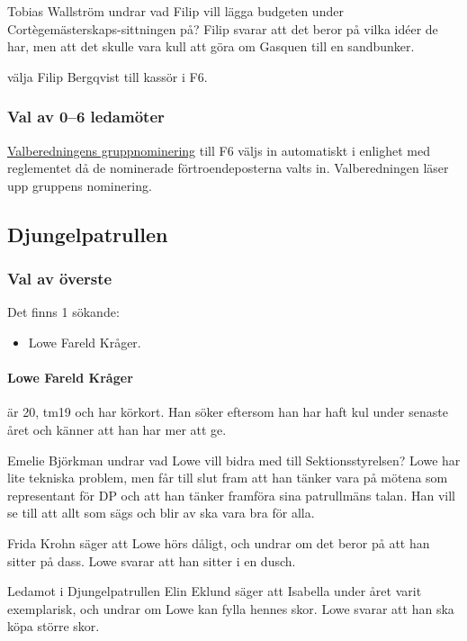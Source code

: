 \documentclass[hidelinks]{sektionsmote}
\begin{document}
Tobias Wallström undrar vad Filip vill lägga budgeten under Cortègemästerskaps-sittningen på?
Filip svarar att det beror på vilka idéer de har, men att det skulle vara kull att göra om Gasquen till en sandbunker.

\begin{beslut}
  \item välja Filip Bergqvist till kassör i F6.
\end{beslut}

\subsubsection{Val av 0--6 ledamöter}
\hyperlink{bilagor/nom/f6.pdf.1}{Valberedningens gruppnominering} till F6 väljs in automatiskt i enlighet med reglementet då de nominerade förtroendeposterna valts in.
Valberedningen läser upp gruppens nominering.

\subsection{Djungelpatrullen}

\subsubsection{Val av överste}
Det finns 1 sökande:
\begin{itemize}
    \item Lowe Fareld Kråger.
\end{itemize}

\paragraph{Lowe Fareld Kråger} är 20, tm19 och har körkort.
Han söker eftersom han har haft kul under senaste året och känner att han har mer att ge.

Emelie Björkman undrar vad Lowe vill bidra med till Sektionsstyrelsen?
Lowe har lite tekniska problem, men får till slut fram att han tänker vara på mötena som representant för DP och att han tänker framföra sina patrullmäns talan.
Han vill se till att allt som sägs och blir av ska vara bra för alla.

Frida Krohn säger att Lowe hörs dåligt, och undrar om det beror på att han sitter på dass.
Lowe svarar att han sitter i en dusch.

Ledamot i Djungelpatrullen Elin Eklund säger att Isabella under året varit exemplarisk, och undrar om Lowe kan fylla hennes skor.
Lowe svarar att han ska köpa större skor.
\end{document}
